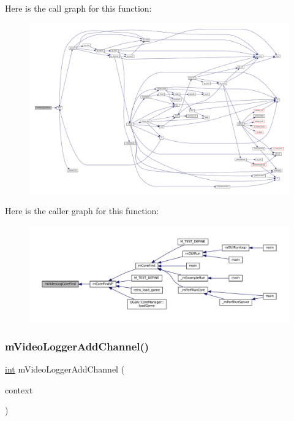 Here is the call graph for this function\+:
\nopagebreak
\begin{figure}[H]
\begin{center}
\leavevmode
\includegraphics[width=350pt]{video-logger_8c_a16da7b6caa981b54250b3a0eb1c945a2_cgraph}
\end{center}
\end{figure}
Here is the caller graph for this function\+:
\nopagebreak
\begin{figure}[H]
\begin{center}
\leavevmode
\includegraphics[width=350pt]{video-logger_8c_a16da7b6caa981b54250b3a0eb1c945a2_icgraph}
\end{center}
\end{figure}
\mbox{\label{video-logger_8c_a27685ba414aed35c5b92736c0ef21ebe}} 
\subsubsection{\texorpdfstring{m\+Video\+Logger\+Add\+Channel()}{mVideoLoggerAddChannel()}}
{\footnotesize\ttfamily \mbox{\hyperlink{ioapi_8h_a787fa3cf048117ba7123753c1e74fcd6}{int}} m\+Video\+Logger\+Add\+Channel (\begin{DoxyParamCaption}\item[{struct m\+Video\+Log\+Context $\ast$}]{context }\end{DoxyParamCaption})}

